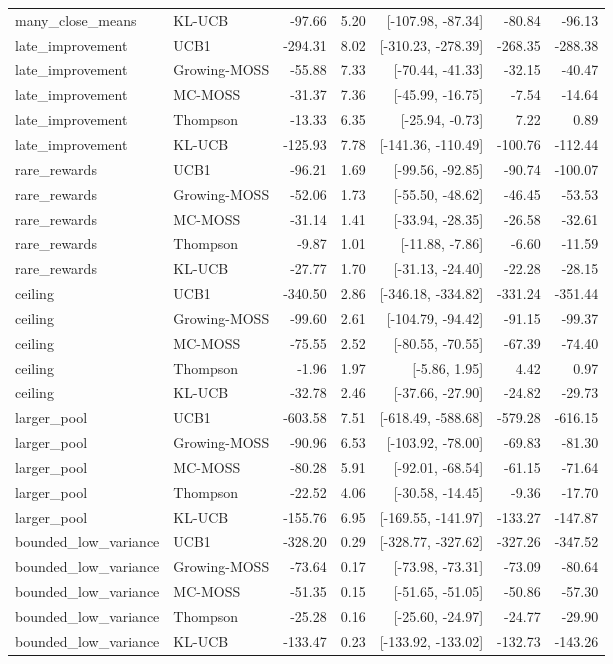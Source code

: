\documentclass[11pt]{article}
\theoremstyle{remark}
\begin{document}
\begin{longtable}{llrrrrr}
many\_close\_means & KL-UCB & -97.66 & 5.20 & [-107.98, -87.34] & -80.84 & -96.13 \\
late\_improvement & UCB1 & -294.31 & 8.02 & [-310.23, -278.39] & -268.35 & -288.38 \\
late\_improvement & Growing-MOSS & -55.88 & 7.33 & [-70.44, -41.33] & -32.15 & -40.47 \\
late\_improvement & MC-MOSS & -31.37 & 7.36 & [-45.99, -16.75] & -7.54 & -14.64 \\
late\_improvement & Thompson & -13.33 & 6.35 & [-25.94, -0.73] & 7.22 & 0.89 \\
late\_improvement & KL-UCB & -125.93 & 7.78 & [-141.36, -110.49] & -100.76 & -112.44 \\
rare\_rewards & UCB1 & -96.21 & 1.69 & [-99.56, -92.85] & -90.74 & -100.07 \\
rare\_rewards & Growing-MOSS & -52.06 & 1.73 & [-55.50, -48.62] & -46.45 & -53.53 \\
rare\_rewards & MC-MOSS & -31.14 & 1.41 & [-33.94, -28.35] & -26.58 & -32.61 \\
rare\_rewards & Thompson & -9.87 & 1.01 & [-11.88, -7.86] & -6.60 & -11.59 \\
rare\_rewards & KL-UCB & -27.77 & 1.70 & [-31.13, -24.40] & -22.28 & -28.15 \\
ceiling & UCB1 & -340.50 & 2.86 & [-346.18, -334.82] & -331.24 & -351.44 \\
ceiling & Growing-MOSS & -99.60 & 2.61 & [-104.79, -94.42] & -91.15 & -99.37 \\
ceiling & MC-MOSS & -75.55 & 2.52 & [-80.55, -70.55] & -67.39 & -74.40 \\
ceiling & Thompson & -1.96 & 1.97 & [-5.86, 1.95] & 4.42 & 0.97 \\
ceiling & KL-UCB & -32.78 & 2.46 & [-37.66, -27.90] & -24.82 & -29.73 \\
larger\_pool & UCB1 & -603.58 & 7.51 & [-618.49, -588.68] & -579.28 & -616.15 \\
larger\_pool & Growing-MOSS & -90.96 & 6.53 & [-103.92, -78.00] & -69.83 & -81.30 \\
larger\_pool & MC-MOSS & -80.28 & 5.91 & [-92.01, -68.54] & -61.15 & -71.64 \\
larger\_pool & Thompson & -22.52 & 4.06 & [-30.58, -14.45] & -9.36 & -17.70 \\
larger\_pool & KL-UCB & -155.76 & 6.95 & [-169.55, -141.97] & -133.27 & -147.87 \\
bounded\_low\_variance & UCB1 & -328.20 & 0.29 & [-328.77, -327.62] & -327.26 & -347.52 \\
bounded\_low\_variance & Growing-MOSS & -73.64 & 0.17 & [-73.98, -73.31] & -73.09 & -80.64 \\
bounded\_low\_variance & MC-MOSS & -51.35 & 0.15 & [-51.65, -51.05] & -50.86 & -57.30 \\
bounded\_low\_variance & Thompson & -25.28 & 0.16 & [-25.60, -24.97] & -24.77 & -29.90 \\
bounded\_low\_variance & KL-UCB & -133.47 & 0.23 & [-133.92, -133.02] & -132.73 & -143.26 \\
\end{longtable}
\endgroup
\end{document}
